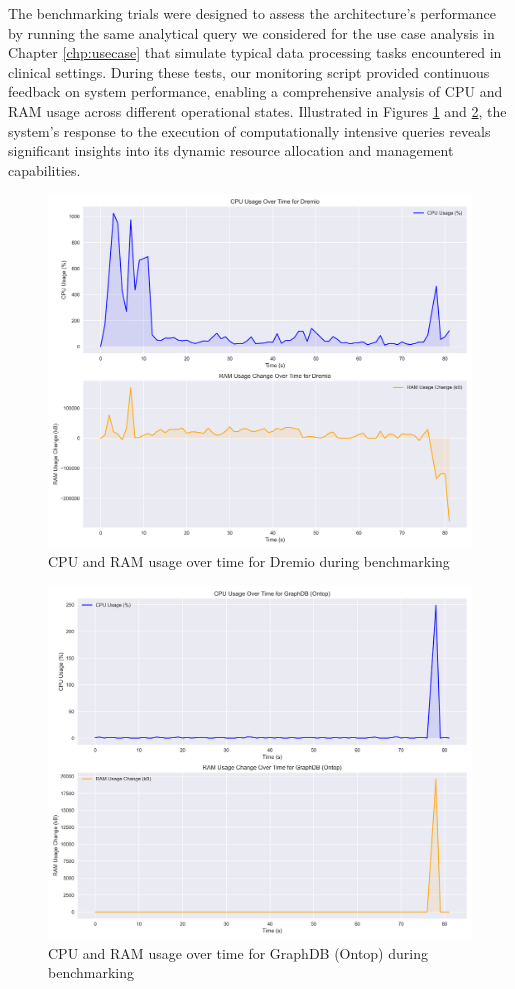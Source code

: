 The benchmarking trials were designed to assess the architecture's performance by running the same analytical query we considered for the use case analysis in Chapter \ref{chp:usecase} that simulate typical data processing tasks encountered in clinical settings. During these tests, our monitoring script provided continuous feedback on system performance, enabling a comprehensive analysis of \ac{CPU} and \ac{RAM} usage across different operational states.
Illustrated in Figures \ref{fig:bench_Dremio} and \ref{fig:bench_GraphDB}, the system's response to the execution of computationally intensive queries reveals significant insights into its dynamic resource allocation and management capabilities.
\begin{figure}[!ht] 
    \centering 
    \includegraphics[width=11.6cm]{res/Dremio_usage_plot.png} 
    \caption{\ac{CPU} and \ac{RAM} usage over time for Dremio during benchmarking} 
    \label{fig:bench_Dremio}
\end{figure}
\begin{figure}[!ht] 
    \centering 
    \includegraphics[width=11.6cm]{res/GraphDB (Ontop)_usage_plot.png} 
    \caption{\ac{CPU} and \ac{RAM} usage over time for GraphDB (Ontop) during benchmarking} 
    \label{fig:bench_GraphDB}
\end{figure}
